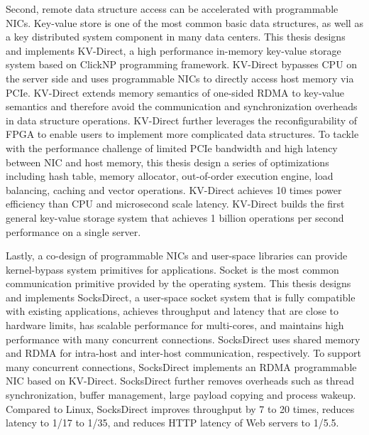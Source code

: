 \begin{enabstract}
Second, remote data structure access can be accelerated with programmable NICs. Key-value store is one of the most common basic data structures, as well as a key distributed system component in many data centers.
This thesis designs and implements KV-Direct, a high performance in-memory key-value storage system based on ClickNP programming framework.
KV-Direct bypasses CPU on the server side and uses programmable NICs to directly access host memory via PCIe.
KV-Direct extends memory semantics of one-sided RDMA to key-value semantics and therefore avoid the communication and synchronization overheads in data structure operations.
KV-Direct further leverages the reconfigurability of FPGA to enable users to implement more complicated data structures.
To tackle with the performance challenge of limited PCIe bandwidth and high latency between NIC and host memory, this thesis design a series of optimizations including hash table, memory allocator, out-of-order execution engine, load balancing, caching and vector operations.
KV-Direct achieves 10 times power efficiency than CPU and microsecond scale latency.
KV-Direct builds the first general key-value storage system that achieves 1 billion operations per second performance on a single server.

Lastly, a co-design of programmable NICs and user-space libraries can provide kernel-bypass system primitives for applications.
Socket is the most common communication primitive provided by the operating system.
This thesis designs and implements SocksDirect, a user-space socket system that is fully compatible with existing applications, achieves throughput and latency that are close to hardware limits, has scalable performance for multi-cores, and maintains high performance with many concurrent connections.
SocksDirect uses shared memory and RDMA for intra-host and inter-host communication, respectively.
To support many concurrent connections, SocksDirect implements an RDMA programmable NIC based on KV-Direct.
SocksDirect further removes overheads such as thread synchronization, buffer management, large payload copying and process wakeup.
Compared to Linux, SocksDirect improves throughput by 7 to 20 times, reduces latency to 1/17 to 1/35, and reduces HTTP latency of Web servers to 1/5.5.

\end{enabstract}
